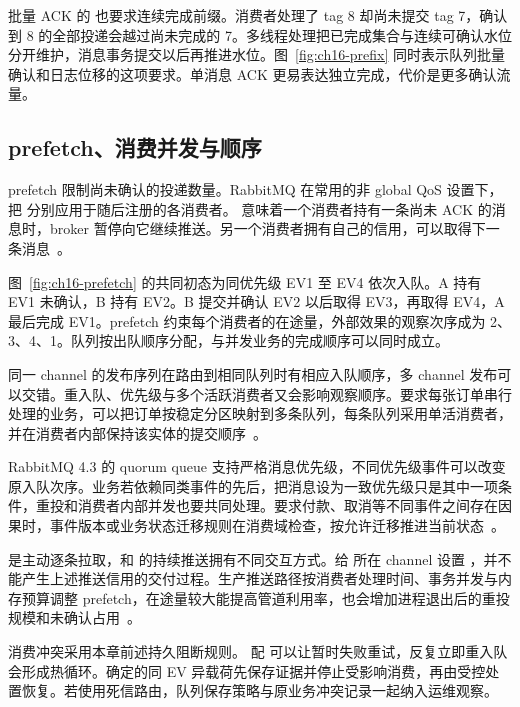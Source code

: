 批量 ACK 的  也要求连续完成前缀。消费者处理了 tag 8 却尚未提交 tag 7，确认到 8 的全部投递会越过尚未完成的 7。多线程处理把已完成集合与连续可确认水位分开维护，消息事务提交以后再推进水位。图~\ref{fig:ch16-prefix} 同时表示队列批量确认和日志位移的这项要求。单消息 ACK 更易表达独立完成，代价是更多确认流量。


\subsection{prefetch、消费并发与顺序}

prefetch 限制尚未确认的投递数量。RabbitMQ 在常用的非 global QoS 设置下，把  分别应用于随后注册的各消费者。 意味着一个消费者持有一条尚未 ACK 的消息时，broker 暂停向它继续推送。另一个消费者拥有自己的信用，可以取得下一条消息~\cite{rabbitmq-consumer-flow}。


图~\ref{fig:ch16-prefetch} 的共同初态为同优先级 EV1 至 EV4 依次入队。A 持有 EV1 未确认，B 持有 EV2。B 提交并确认 EV2 以后取得 EV3，再取得 EV4，A 最后完成 EV1。prefetch 约束每个消费者的在途量，外部效果的观察次序成为 2、3、4、1。队列按出队顺序分配，与并发业务的完成顺序可以同时成立。

同一 channel 的发布序列在路由到相同队列时有相应入队顺序，多 channel 发布可以交错。重入队、优先级与多个活跃消费者又会影响观察顺序。要求每张订单串行处理的业务，可以把订单按稳定分区映射到多条队列，每条队列采用单活消费者，并在消费者内部保持该实体的提交顺序~\cite{rabbitmq-queues,rabbitmq-consumer-flow}。

RabbitMQ 4.3 的 quorum queue 支持严格消息优先级，不同优先级事件可以改变原入队次序。业务若依赖同类事件的先后，把消息设为一致优先级只是其中一项条件，重投和消费者内部并发也要共同处理。要求付款、取消等不同事件之间存在因果时，事件版本或业务状态迁移规则在消费域检查，按允许迁移推进当前状态~\cite{rabbitmq-quorum-queues}。

 是主动逐条拉取，和  的持续推送拥有不同交互方式。给  所在 channel 设置 ，并不能产生上述推送信用的交付过程。生产推送路径按消费者处理时间、事务并发与内存预算调整 prefetch，在途量较大能提高管道利用率，也会增加进程退出后的重投规模和未确认占用~\cite{rabbitmq-consumer-flow}。

消费冲突采用本章前述持久阻断规则。 配  可以让暂时失败重试，反复立即重入队会形成热循环。确定的同 EV 异载荷先保存证据并停止受影响消费，再由受控处置恢复。若使用死信路由，队列保存策略与原业务冲突记录一起纳入运维观察。
